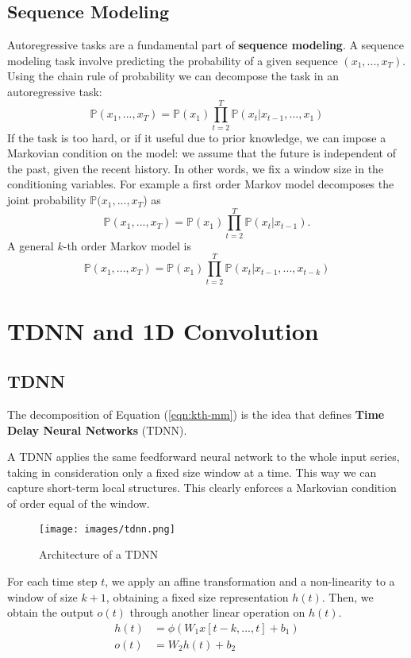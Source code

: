 \documentclass[oneside]{book}
\theoremstyle{definition}
\theoremstyle{plain}
\begin{document}
\subsection{Sequence Modeling}
Autoregressive tasks are a fundamental part of \textbf{sequence modeling}. A sequence modeling task involve predicting the probability of a given sequence $(x_1,...,x_T)$. Using the chain rule of probability we can decompose the task in an autoregressive task:
\begin{equation}
    \mathbb{P}(x_1,...,x_T) =\mathbb{P}(x_1)\prod_{t=2}^{T}\mathbb{P}(x_t|x_{t-1},...,x_1)
\end{equation}
If the task is too hard, or if it useful due to prior knowledge, we can impose a Markovian condition on the model: we assume that the future is independent of the past, given the recent history. In other words, we fix a window size in the conditioning variables. For example a first order Markov model decomposes the joint probability $\mathbb{P}(x_1,...,x_T$) as
\[
    \mathbb{P}(x_1,...,x_T)=\mathbb{P}(x_1)\prod_{t=2}^{T}\mathbb{P}(x_t|x_{t-1}).
\]
A general $k$-th order Markov model is
\begin{equation}\label{eqn:kth-mm}
    \mathbb{P}(x_1,...,x_T) =\mathbb{P}(x_1)\prod_{t=2}^{T}\mathbb{P}(x_t|x_{t-1},...,x_{t-k})
\end{equation}
\section{TDNN and 1D Convolution}
\subsection{TDNN}
The decomposition of Equation (\ref{eqn:kth-mm}) is the idea that defines \textbf{Time Delay Neural Networks} (TDNN).

A TDNN applies the same feedforward neural network to the whole input series, taking in consideration only a fixed size window at a time. This way we can capture  short-term local structures. This clearly enforces a Markovian condition of order equal of the window.

\begin{figure}
    \centering
    \texttt{[image: images/tdnn.png]}
    \caption{Architecture of a TDNN}
    \label{fig:tdnn}
\end{figure}
For each time step $t$, we apply an affine transformation and a non-linearity to a window of size $k+1$, obtaining a fixed size representation $h(t)$. Then, we obtain the output $o(t)$ through another linear operation on $h(t)$.
\begin{align}
    h(t)&=\phi \left(
        W_1 x[t-k,...,t] + b_1
    \right)\\
    o(t)&=W_2h(t)+b_2
\end{align}
\end{document}
